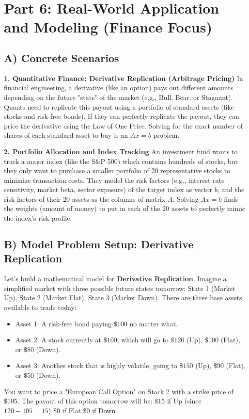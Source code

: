 \documentclass{article}
\begin{document}
\newpage
\section{Part 6: Real-World Application and Modeling (Finance Focus)}

\subsection{A) Concrete Scenarios}
\textbf{1. Quantitative Finance: Derivative Replication (Arbitrage Pricing)}
In financial engineering, a derivative (like an option) pays out different amounts depending on the future "state" of the market (e.g., Bull, Bear, or Stagnant). Quants need to replicate this payout using a portfolio of standard assets (like stocks and risk-free bonds). If they can perfectly replicate the payout, they can price the derivative using the Law of One Price. Solving for the exact number of shares of each standard asset to buy is an $Ax = b$ problem.

\textbf{2. Portfolio Allocation and Index Tracking}
An investment fund wants to track a major index (like the S\&P 500) which contains hundreds of stocks, but they only want to purchase a smaller portfolio of 20 representative stocks to minimize transaction costs. They model the risk factors (e.g., interest rate sensitivity, market beta, sector exposure) of the target index as vector $b$, and the risk factors of their 20 assets as the columns of matrix $A$. Solving $Ax = b$ finds the weights (amount of money) to put in each of the 20 assets to perfectly mimic the index's risk profile.

\subsection{B) Model Problem Setup: Derivative Replication}
Let's build a mathematical model for \textbf{Derivative Replication}. 
Imagine a simplified market with three possible future states tomorrow: State 1 (Market Up), State 2 (Market Flat), State 3 (Market Down).
There are three base assets available to trade today: 
\begin{itemize}
    \item Asset 1: A risk-free bond paying $\$100$ no matter what.
    \item Asset 2: A stock currently at $\$100$, which will go to $\$120$ (Up), $\$100$ (Flat), or $\$80$ (Down).
    \item Asset 3: Another stock that is highly volatile, going to $\$150$ (Up), $\$90$ (Flat), or $\$50$ (Down).
\end{itemize}
You want to price a "European Call Option" on Stock 2 with a strike price of $\$105$. The payout of this option tomorrow will be:
$\$15$ if Up (since $120 - 105 = 15$)
$\$0$ if Flat
$\$0$ if Down
\end{document}
